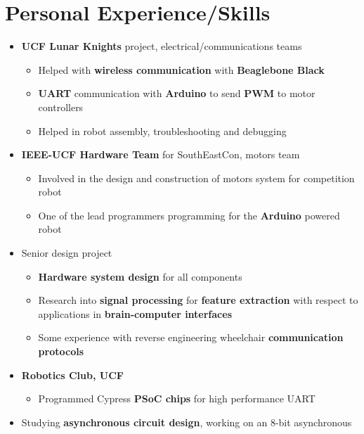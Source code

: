 \documentclass{my_resume}
\begin{document}
\section{Personal Experience/Skills}
\begin{itemize}
    \item \textbf{UCF Lunar Knights} project, electrical/communications teams
        \begin{itemize}
            \item Helped with \textbf{wireless communication} with
                \textbf{Beaglebone Black}
            \item \textbf{UART} communication with \textbf{Arduino} to send
                \textbf{PWM} to motor controllers
            \item Helped in robot assembly, troubleshooting and debugging
        \end{itemize}
    \item \textbf{IEEE-UCF Hardware Team} for SouthEastCon, motors team
        \begin{itemize}
            \item Involved in the design and construction of motors system for
                competition robot
            \item One of the lead programmers programming for the \textbf{Arduino}
                powered robot
        \end{itemize}
    \item Senior design project
        \begin{itemize}
            \item \textbf{Hardware system design} for all components
            \item Research into \textbf{signal processing} for \textbf{feature extraction}
                with respect to applications in \textbf{brain-computer interfaces}
            \item Some experience with reverse engineering wheelchair 
                \textbf{communication protocols}
        \end{itemize}
    \item \textbf{Robotics Club, UCF}
        \begin{itemize}
            \item Programmed Cypress \textbf{PSoC chips} for high performance UART
        \end{itemize}
    \item Studying \textbf{asynchronous circuit design}, working on an 8-bit asynchronous

\end{itemize}
\end{document}
